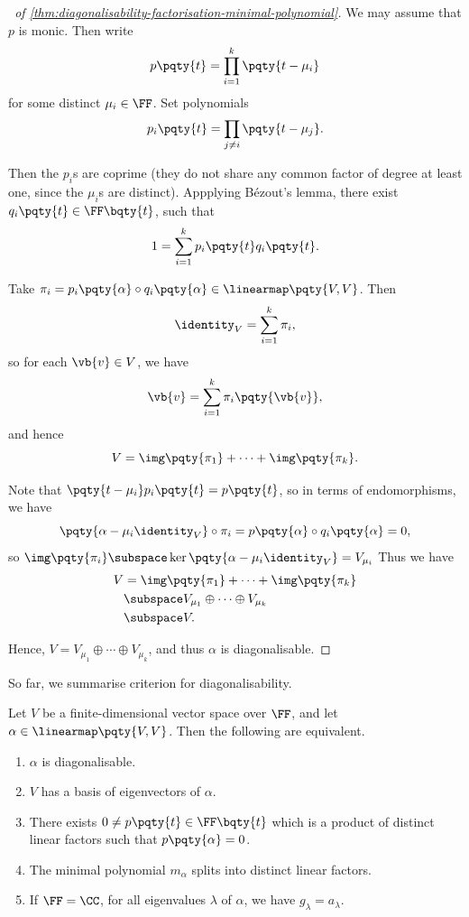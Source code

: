 \begin{proof}[\proofname\ of \autoref{thm:diagonalisability-factorisation-minimal-polynomial}]
    We may assume that \(p\) is monic. Then write
    \[
        p\pqty{t} = \prod_{i = 1}^{k} \pqty{t - \mu_i}
    \]
    for some distinct \(\mu_i \in \FF\). Set polynomials
    \[
        p_i\pqty{t} = \prod_{j \neq i} \pqty{t - \mu_j}.
    \]  

    Then the \(p_i\)s are coprime (they do not share any common factor of degree at least one, since the \(\mu_i\)s are distinct). Appplying B\'{e}zout's lemma, there exist \(q_i\pqty{t} \in \FF\bqty{t}\), such that
    \[
        1 = \sum_{i = 1}^{k} p_i\pqty{t} q_i\pqty{t}.
    \]

    Take \(\pi_i = p_i\pqty{\alpha} \circ q_i\pqty{\alpha} \in \linearmap\pqty{V, V}\). Then
    \[
        \identity_V = \sum_{i = 1}^{k} \pi_i,
    \]
    so for each \(\vb{v} \in V\), we have
    \[
        \vb{v} = \sum_{i = 1}^{k} \pi_i \pqty{\vb{v}},
    \]
    and hence
    \[
        V = \img\pqty{\pi_1} + \cdots + \img\pqty{\pi_k}.
    \]

    Note that \(\pqty{t - \mu_i} p_i\pqty{t} = p\pqty{t}\), so in terms of endomorphisms, we have
    \[
        \pqty{\alpha - \mu_i \identity_V} \circ \pi_i = p\pqty{\alpha} \circ q_i \pqty{\alpha} = 0,
    \]
    so \(\img\pqty{\pi_i} \subspace \ker\pqty{\alpha - \mu_i \identity_V} = V_{\mu_i}\) Thus we have
    \begin{align*}
        V &= \img\pqty{\pi_1} + \cdots + \img\pqty{\pi_k} \\
        &\subspace V_{\mu_1} \oplus \cdots \oplus V_{\mu_k} \\
        &\subspace V.
    \end{align*}

    Hence, \(V = V_{\mu_1} \oplus \cdots \oplus V_{\mu_k}\), and thus \(\alpha\) is diagonalisable.
\end{proof}

So far, we summarise criterion for diagonalisability.

\begin{theorem}
    Let \(V\) be a finite-dimensional vector space over \(\FF\), and let \(\alpha \in \linearmap\pqty{V, V}\). Then the following are equivalent.
    \begin{enumerate}[label=(\roman*)]
        \item \(\alpha\) is diagonalisable.
        \item \(V\) has a basis of eigenvectors of \(\alpha\).
        \item There exists \(0 \neq p\pqty{t} \in \FF\bqty{t}\) which is a product of distinct linear factors such that \(p\pqty{\alpha} = 0\).
        \item The minimal polynomial \(m_\alpha\) splits into distinct linear factors.
        \item If \(\FF = \CC\), for all eigenvalues \(\lambda\) of \(\alpha\), we have \(g_{\lambda} = a_{\lambda}\).
    \end{enumerate}
\end{theorem}

